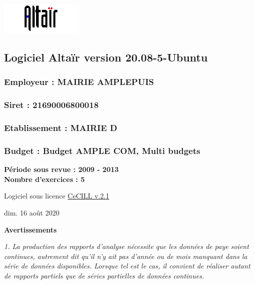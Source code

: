\includegraphics{icones/altair.png}

\hypertarget{logiciel-altair-version-20.08-5-ubuntu}{%
\subsection{Logiciel Altaïr version
20.08-5-Ubuntu}\label{logiciel-altair-version-20.08-5-ubuntu}}

\hypertarget{employeur-mairie-amplepuis}{%
\subsubsection{Employeur : MAIRIE
AMPLEPUIS}\label{employeur-mairie-amplepuis}}

\hypertarget{siret-21690006800018}{%
\subsubsection{Siret : 21690006800018}\label{siret-21690006800018}}

\hypertarget{etablissement-mairie-d}{%
\subsubsection{Etablissement : MAIRIE D}\label{etablissement-mairie-d}}

\hypertarget{budget-budget-ample-com-multi-budgets}{%
\subsubsection{Budget : Budget AMPLE COM, Multi
budgets}\label{budget-budget-ample-com-multi-budgets}}

\textbf{Période sous revue : 2009 - 2013 }\\
\textbf{Nombre d'exercices : 5 }

Logiciel sous licence \href{../Docs/LICENCE.html}{CeCILL v.2.1}

dim. 16 août 2020

\textbf{Avertissements}

\emph{1. La production des rapports d'analyse nécessite que les données
de paye soient continues, autrement dit qu'il n'y ait pas d'année ou de
mois manquant dans la série de données disponibles. Lorsque tel est le
cas, il convient de réaliser autant de rapports partiels que de séries
partielles de données continues.}

